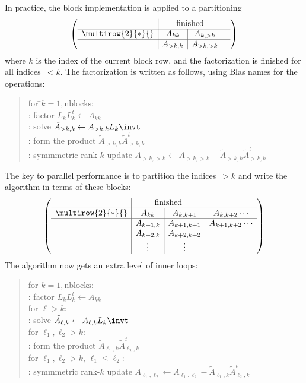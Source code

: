 In practice, the block implementation is applied to a partitioning
\[
\left(
\begin{array}{c|c|cc}
  &\multicolumn{2}{c}{\mathrm{finished}}\\ \hline
  \multirow{2}{*}{}&A_{kk}&A_{k,>k}&\\ \hline
  &A_{>k,k}&A_{>k,>k}
\end{array}
\right)
\]
where $k$ is the index of the current block row, and the
factorization is finished for all indices~$<k$.
The factorization is written as follows,
using Blas names for the operations:
\begin{quotation}
  \begin{tabbing}
    for \=$k=1,\mathrm{nblocks}$:\\
    \>: factor $L_kL_k^t\leftarrow A_{kk}$\\
    \>: solve $\tilde A_{>k,k} \leftarrow A_{>k,k}L_k\invt$\\
    \>: form the product $\tilde A_{>k,k}\tilde A_{>k,k}^t$\\
    \>: symmmetric rank-$k$ update
    $A_{>k,>k}\leftarrow A_{>k,>k}-\tilde A_{>k,k}\tilde A_{>k,k}^t$
  \end{tabbing}
\end{quotation}
The key to parallel performance is to partition the indices~$>k$ and
write the algorithm in terms of these blocks:
\[
\left(
\begin{array}{c|c|cc}
  &\multicolumn{2}{c}{\mathrm{finished}}\\ \hline
  \multirow{2}{*}{}&A_{kk}&A_{k,k+1}&A_{k,k+2}\cdots\\ \hline
  &A_{k+1,k}&A_{k+1,k+1}&A_{k+1,k+2}\cdots\\
  &A_{k+2,k}&A_{k+2,k+2}\\
  &\vdots&\vdots
\end{array}
\right)
\]
The algorithm now gets an extra level of inner loops:
\begin{quotation}
  \begin{tabbing}
    for \=$k=1,\mathrm{nblocks}$:\\
    \>: factor $L_kL_k^t \leftarrow A_{kk}$\\
    \>for \=$\ell>k$:\\
    \>\>: solve $\tilde A_{\ell,k} \leftarrow A_{\ell,k}L_k\invt$\\
    \>for \=$\ell_1,\ell_2>k$:\\
    \>\>: form the product $\tilde A_{\ell_1,k}\tilde A_{\ell_2,k}^t$\\
    \>for \=$\ell_1,\ell_2>k$, $\ell_1\leq\ell_2$:\\
    \>\>: symmmetric rank-$k$ update
    $A_{\ell_1,\ell_2}\leftarrow A_{\ell_1,\ell_2}
    -\tilde A_{\ell_1,k}\tilde A_{\ell_2,k}^t$
  \end{tabbing}
\end{quotation}


